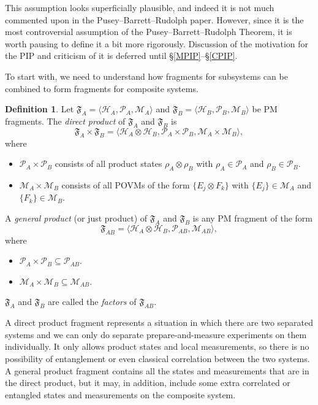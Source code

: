\documentclass[DIV=calc,fontsize=12pt]{scrartcl} %
\theoremstyle{definition}
\newtheorem{definition}{Definition}[section]
\theoremstyle{plain}
\newcommand{\Hilb}[1][]{\ensuremath{\mathcal{H}_{#1}}}
\begin{document}
This assumption looks superficially plausible, and indeed it is not
much commented upon in the Pusey--Barrett--Rudolph paper.  However, since it is the most
controversial assumption of the Pusey--Barrett--Rudolph Theorem, it is worth pausing to
define it a bit more rigorously.  Discussion of the motivation for the
PIP and criticism of it is deferred until \S\ref{MPIP}--\S\ref{CPIP}.

To start with, we need to understand how fragments for subsystems
can be combined to form fragments for composite systems.
\begin{definition}
Let $\mathfrak{F}_A = \langle \Hilb[A], \mathcal{P}_A, \mathcal{M}_A
\rangle$ and $\mathfrak{F}_B = \langle \Hilb[B], \mathcal{P}_B,
\mathcal{M}_B \rangle$ be PM fragments.  The \emph{direct product}
of $\mathfrak{F}_A$ and $\mathfrak{F}_B$ is
\begin{equation}
\mathfrak{F}_A \times \mathfrak{F}_B = \langle \Hilb[A] \otimes
\Hilb[B], \mathcal{P}_A \times \mathcal{P}_B, \mathcal{M}_A \times
\mathcal{M}_B \rangle,
\end{equation}
where
\begin{itemize}
\item $\mathcal{P}_A \times \mathcal{P}_B$ consists of all product
states $\rho_A \otimes \rho_B$ with $\rho_A \in \mathcal{P}_A$ and
$\rho_B \in \mathcal{P}_B$.
\item $\mathcal{M}_A \times \mathcal{M}_B$ consists of all POVMs of
the form $\{E_j \otimes F_k\}$ with $\{E_j\} \in \mathcal{M}_A$
and $\{F_k\} \in \mathcal{M}_B$.
\end{itemize}

A \emph{general product} (or just product) of $\mathfrak{F}_A$ and
$\mathfrak{F}_B$ is any PM fragment of the form
\begin{equation}
\mathfrak{F}_{AB} = \langle \Hilb[A] \otimes \Hilb[B],
\mathcal{P}_{AB}, \mathcal{M}_{AB} \rangle,
\end{equation}
where
\begin{itemize}
\item $\mathcal{P}_A \times \mathcal{P}_B \subseteq
\mathcal{P}_{AB}$.
\item $\mathcal{M}_A \times \mathcal{M}_B \subseteq
\mathcal{M}_{AB}$.
\end{itemize}

$\mathfrak{F}_A$ and $\mathfrak{F}_B$ are called the \emph{factors}
of $\mathfrak{F}_{AB}$.
\end{definition}

A direct product fragment represents a situation in which there are
two separated systems and we can only do separate prepare-and-measure
experiments on them individually.  It only allows product states and
local measurements, so there is no possibility of entanglement or even
classical correlation between the two systems.  A general product
fragment contains all the states and measurements that are in the
direct product, but it may, in addition, include some extra correlated
or entangled states and measurements on the composite system.
\end{document}
